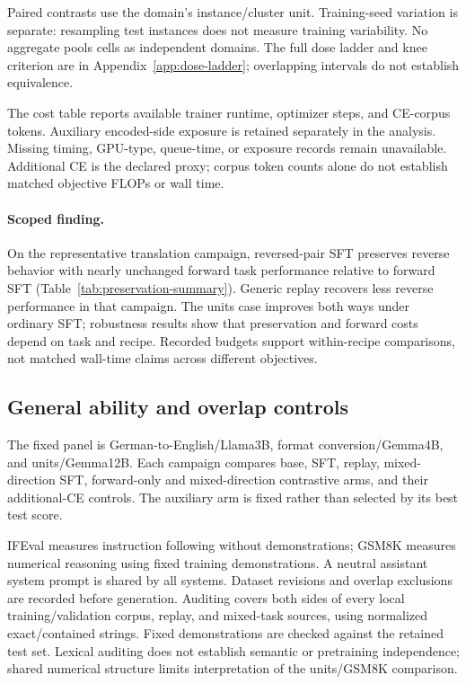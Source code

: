 Paired contrasts use the domain's instance/cluster unit. Training-seed variation is separate:
resampling test instances does not measure training variability. No aggregate pools cells as
independent domains. The full dose ladder and knee criterion are in
Appendix~\ref{app:dose-ladder}; overlapping intervals do not establish equivalence.

The cost table reports available trainer runtime, optimizer steps, and CE-corpus tokens.
Auxiliary encoded-side exposure is retained separately in the analysis. Missing timing,
GPU-type, queue-time, or exposure records remain unavailable. Additional CE is the declared
proxy; corpus token counts alone do not establish matched objective FLOPs or wall time.
\paragraph{Scoped finding.} On the representative translation campaign, reversed-pair SFT
preserves reverse behavior with nearly unchanged forward task performance relative to forward
SFT (Table~\ref{tab:preservation-summary}). Generic replay recovers less reverse performance
in that campaign. The units case improves both ways under ordinary SFT; robustness results
show that preservation and forward costs depend on task and recipe. Recorded budgets support
within-recipe comparisons, not matched wall-time claims across different objectives.

\subsection{General ability and overlap controls}
\label{app:general-probes}

The fixed panel is German-to-English/Llama3B, format conversion/Gemma4B, and units/Gemma12B.
Each campaign compares base, SFT, replay, mixed-direction SFT, forward-only and mixed-direction
contrastive arms, and their additional-CE controls. The auxiliary arm is fixed rather than
selected by its best test score.

IFEval measures instruction following without demonstrations; GSM8K measures numerical
reasoning using fixed training demonstrations. A neutral assistant system prompt is shared
by all systems. Dataset revisions and overlap exclusions are recorded before generation.
Auditing covers both sides of every local training/validation corpus, replay, and mixed-task
sources, using normalized exact/contained strings. Fixed demonstrations are checked against
the retained test set. Lexical auditing does not establish semantic or pretraining independence;
shared numerical structure limits interpretation of the units/GSM8K comparison.


